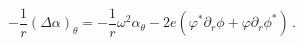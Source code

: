 \begin{equation}
-\frac 1r (\Delta \alpha)_\theta = -\frac 1r \omega^2
\alpha_\theta - 2e \left( \varphi^* \partial_r \phi +
\varphi\partial_r \phi^* \right) \,. \label{apa5}
\end{equation}

